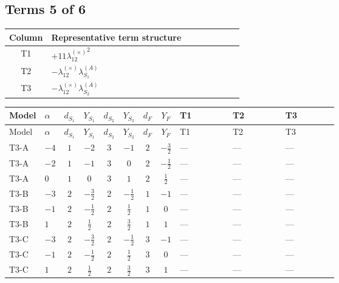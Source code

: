 \documentclass[8pt]{article}
\begin{document}
\begin{landscape}
\subsection*{Terms 5 of 6}
\begin{center}
\begin{tabular}{@{}c >{\raggedright\arraybackslash}p{0.82\linewidth}@{}}
\toprule
Column & Representative term structure \\
\midrule
T1 & \(\displaystyle +11 {\lambda_{12}^{(\times)}}^2\) \\
\midrule
T2 & \(\displaystyle -{\lambda_{12}^{(\times)}} {\lambda_{S_1}^{(A)}}\) \\
\midrule
T3 & \(\displaystyle -{\lambda_{12}^{(\times)}} {\lambda_{S_2}^{(A)}}\) \\
\midrule
\bottomrule
\end{tabular}
\end{center}
\smallskip
\tiny
\begin{longtable}{@{}llcccccc >{\raggedright\arraybackslash}p{0.21\linewidth} >{\raggedright\arraybackslash}p{0.21\linewidth} >{\raggedright\arraybackslash}p{0.21\linewidth}@{}}
\toprule
Model & $\alpha$ & $d_{S_1}$ & $Y_{S_1}$ & $d_{S_2}$ & $Y_{S_2}$ & $d_F$ & $Y_F$ & T1 & T2 & T3 \\
\midrule
\endfirsthead
\toprule
Model & $\alpha$ & $d_{S_1}$ & $Y_{S_1}$ & $d_{S_2}$ & $Y_{S_2}$ & $d_F$ & $Y_F$ & T1 & T2 & T3 \\
\midrule
\endhead
T3-A & $-4$ & $1$ & $-2$ & $3$ & $-1$ & $2$ & $-\frac{3}{2}$ & --- & --- & --- \\
\midrule
T3-A & $-2$ & $1$ & $-1$ & $3$ & $0$ & $2$ & $-\frac{1}{2}$ & --- & --- & --- \\
\midrule
T3-A & $0$ & $1$ & $0$ & $3$ & $1$ & $2$ & $\frac{1}{2}$ & --- & --- & --- \\
\midrule
T3-B & $-3$ & $2$ & $-\frac{3}{2}$ & $2$ & $-\frac{1}{2}$ & $1$ & $-1$ & --- & --- & --- \\
\midrule
T3-B & $-1$ & $2$ & $-\frac{1}{2}$ & $2$ & $\frac{1}{2}$ & $1$ & $0$ & --- & --- & --- \\
\midrule
T3-B & $1$ & $2$ & $\frac{1}{2}$ & $2$ & $\frac{3}{2}$ & $1$ & $1$ & --- & --- & --- \\
\midrule
T3-C & $-3$ & $2$ & $-\frac{3}{2}$ & $2$ & $-\frac{1}{2}$ & $3$ & $-1$ & --- & --- & --- \\
\midrule
T3-C & $-1$ & $2$ & $-\frac{1}{2}$ & $2$ & $\frac{1}{2}$ & $3$ & $0$ & --- & --- & --- \\
\midrule
T3-C & $1$ & $2$ & $\frac{1}{2}$ & $2$ & $\frac{3}{2}$ & $3$ & $1$ & --- & --- & --- \\

\end{longtable}
\end{landscape}
\end{document}
